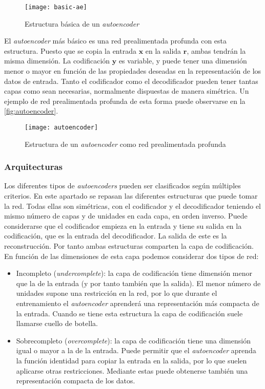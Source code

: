 \begin{figure}[htpb]
  \centering
  \texttt{[image: basic-ae]}
  \caption{Estructura básica de un \textit{autoencoder}}
  \label{fig:basic-ae}
\end{figure}

El \textit{autoencoder} más básico es una red prealimentada profunda con esta estructura. Puesto que se copia la entrada $\textbf{x}$ en la salida $\textbf{r}$, ambas tendrán la misma dimensión. La codificación $\textbf{y}$ es variable, y puede tener una dimensión menor o mayor en función de las propiedades deseadas en la representación de los datos de entrada. Tanto el codificador como el decodificador pueden tener tantas capas como sean necesarias, normalmente dispuestas de manera simétrica. Un ejemplo de red prealimentada profunda de esta forma puede observarse en la \autoref{fig:autoencoder}.

\begin{figure}[htpb]
  \centering
  \texttt{[image: autoencoder]}
  \caption{Estructura de un \textit{autoencoder} como red prealimentada profunda}
  \label{fig:autoencoder}
\end{figure}

\subsubsection{Arquitecturas}

Los diferentes tipos de \textit{autoencoders} pueden ser clasificados según múltiples criterios. En este apartado se repasan las diferentes estructuras que puede tomar la red. Todas ellas son simétricas, con el codificador y el decodificador teniendo el mismo número de capas y de unidades en cada capa, en orden inverso. Puede considerarse que el codificador empieza en la entrada y tiene su salida en la codificación, que es la entrada del decodificador. La salida de este es la reconstrucción. Por tanto ambas estructuras comparten la capa de codificación. En función de las dimensiones de esta capa podemos considerar dos tipos de red:

\begin{itemize}
\item Incompleto (\textit{undercomplete}): la capa de codificación tiene dimensión menor que la de la entrada (y por tanto también que la salida). El menor número de unidades supone una restricción en la red, por lo que durante el entrenamiento el \textit{autoencoder} aprenderá una representación más compacta de la entrada. Cuando se tiene esta estructura la capa de codificación suele llamarse cuello de botella.
\item Sobrecompleto (\textit{overcomplete}): la capa de codificación tiene una dimensión igual o mayor a la de la entrada. Puede permitir que el \textit{autoencoder} aprenda la función identidad para copiar la entrada en la salida, por lo que suelen aplicarse otras restricciones. Mediante estas puede obtenerse también una representación compacta de los datos.
\end{itemize}

